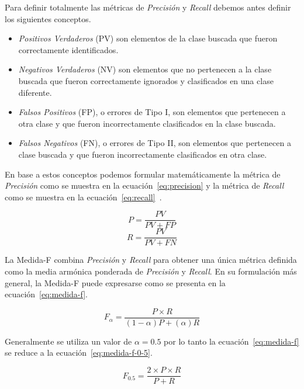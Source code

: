 \documentclass[runningheads,a4paper]{llncs}
\begin{document}
Para definir totalmente las métricas de \emph{Precisión} y \emph{Recall} debemos antes definir los siguientes conceptos.
\begin{itemize}
\item{\emph{Positivos Verdaderos} (PV) son elementos de la clase buscada que fueron correctamente identificados.}
\item{\emph{Negativos Verdaderos} (NV) son elementos que no pertenecen a la clase buscada que fueron correctamente ignorados y clasificados en una clase diferente.}
\item{\emph{Falsos Positivos} (FP), o errores de Tipo I, son elementos que pertenecen a otra clase y que fueron incorrectamente clasificados en la clase buscada.}
\item{\emph{Falsos Negativos} (FN), o errores de Tipo II, son elementos que pertenecen a clase buscada y que fueron incorrectamente clasificados en otra clase.}
\end{itemize}

En base a estos conceptos podemos formular matemáticamente la métrica de \emph{Precisión} como se muestra en la ecuación~\ref{eq:precision} y la métrica de \emph{Recall} como se muestra en la ecuación~\ref{eq:recall}~\cite{BIRD09}.

\begin{equation}
	\label{eq:precision}
	P = \frac{PV}{PV + FP}
\end{equation}
\begin{equation}
	\label{eq:recall}
	R = \frac{PV}{PV + FN}
\end{equation}

La Medida-F combina \emph{Precisi\'on} y \emph{Recall} para obtener una \'unica m\'etrica definida como la media arm\'onica ponderada de \emph{Precisi\'on} y \emph{Recall}. En su formulaci\'on m\'as general, la Medida-F puede expresarse como se presenta en la ecuaci\'on~\ref{eq:medida-f}.

\begin{equation}
	\label{eq:medida-f}
	F_{\alpha} = \frac{P \times R}{(1 - \alpha)P + (\alpha)R}
\end{equation}

Generalmente se utiliza un valor de $\alpha=0.5$ por lo tanto la ecuación~\ref{eq:medida-f} se reduce a la ecuación~\ref{eq:medida-f-0-5}\cite{MAKHOUL99}.

\begin{equation}
	\label{eq:medida-f-0-5}
	F_{0.5} = \frac{2 \times P \times R}{P + R}
\end{equation}
\end{document}
